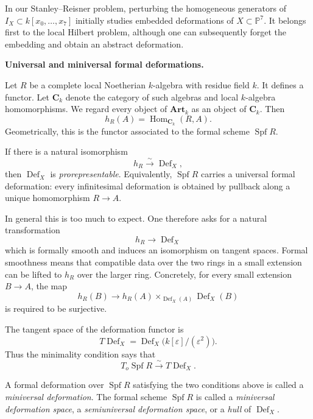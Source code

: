 In our Stanley--Reisner problem, perturbing
the homogeneous generators of
$I_X\subset k[x_0,\ldots,x_7]$ initially
studies embedded deformations of
$X\subset \mathbb{P}^7$. It belongs first
to the local Hilbert problem, although
one can subsequently forget the embedding
and obtain an abstract deformation.

\medskip
\noindent
\textbf{Universal and miniversal formal
deformations.}

\noindent
Let $R$ be a complete local Noetherian
$k$-algebra with residue field $k$. It
defines a functor. Let $\mathbf{C}_k$ denote
the category of such algebras and local
$k$-algebra homomorphisms. We regard every
object of $\mathbf{Art}_k$ as an object of
$\mathbf{C}_k$. Then
$$
h_R(A)=\operatorname{Hom}_{\mathbf{C}_k}
(R,A).
$$
Geometrically, this is the functor associated
to the formal scheme $\operatorname{Spf}R$.

If there is a natural isomorphism
$$
h_R\xrightarrow{\sim}
\operatorname{Def}_X,
$$
then $\operatorname{Def}_X$ is
\emph{prorepresentable}. Equivalently,
$\operatorname{Spf}R$ carries a universal
formal deformation: every infinitesimal
deformation is obtained by pullback along a
unique homomorphism $R\to A$.

In general this is too much to expect. One
therefore asks for a natural transformation
$$
h_R\longrightarrow\operatorname{Def}_X
$$
which is formally smooth and induces an
isomorphism on tangent spaces. Formal
smoothness means that compatible data over
the two rings in a small extension can be
lifted to $h_R$ over the larger ring.
Concretely, for every small extension
$B\longrightarrow A$, the map
$$
h_R(B)\longrightarrow
h_R(A)\times_{\operatorname{Def}_X(A)}
\operatorname{Def}_X(B)
$$
is required to be surjective.

The tangent space of the deformation functor
is
$$
T\operatorname{Def}_X=
\operatorname{Def}_X
\big(k[\varepsilon]/(\varepsilon^2)\big).
$$
Thus the minimality condition says that
$$
T_o\operatorname{Spf}R
\xrightarrow{\sim}
T\operatorname{Def}_X.
$$

\begin{definition}
\label{definition-miniversal-deformation}
A formal deformation over
$\operatorname{Spf}R$ satisfying the two
conditions above is called a
\emph{miniversal deformation}. The formal
scheme $\operatorname{Spf}R$ is called a
\emph{miniversal deformation space}, a
\emph{semiuniversal deformation space}, or
a \emph{hull} of $\operatorname{Def}_X$.
\end{definition}

